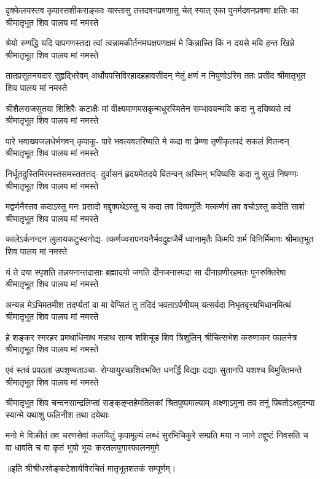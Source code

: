 \fourlineindentedshloka
{दृक्केलयस्तव कृपारसशीकराङ्काः}
{यास्तासु तत्तदवनप्रवणासु चेत् स्यात्}
{एका पुनर्मदवनप्रवणा क्षतिः का}
{श्रीमातृभूत शिव पालय मां नमस्ते} %

\fourlineindentedshloka
{श्रेयो रुणद्धि यदि पापगणस्तदा त्वां}
{त्वन्नामकीर्तनमघक्षपणक्षमं मे}
{किन्नास्ति किं न दयसे मयि हन्त खिन्ने}
{श्रीमातृभूत शिव पालय मां नमस्ते} %

\fourlineindentedshloka
{तातप्रसूतनयदार सुहृद्भिरेवम्}
{अर्थोपपत्तिविरहादहहावसीदन्}
{नेतुं क्षणं न निपुणोऽस्मि ततः प्रसीद}
{श्रीमातृभूत शिव पालय मां नमस्ते} %

\fourlineindentedshloka
{श्रीशैलराजसुतया शिशिरैः कटाक्षैः}
{मां वीक्ष्यमाणमसकृन्मधुरस्मितेन}
{सम्भावयन्मयि कदा नु दयिष्यसे त्वं}
{श्रीमातृभूत शिव पालय मां नमस्ते} %

\fourlineindentedshloka
{पारे भवाख्यजलधेर्भगवन् कृपाकू-}
{पारे भवत्यवतरिष्यति मे कदा वा}
{प्रेम्णा तृणीकृतपदं सकलं वितन्वन्}
{श्रीमातृभूत शिव पालय मां नमस्ते} %

\fourlineindentedshloka
{निर्धूतदुस्तिमिरमस्तसमस्ततत्तद्-}
{दुर्वासनं हृदयमेतदये वितन्वन्}
{अस्मिन् भविष्यसि कदा नु सुखं निषण्णः}
{श्रीमातृभूत शिव पालय मां नमस्ते} %

\fourlineindentedshloka
{मद्वर्णनैस्तव कदाऽस्तु मनः प्रसादो}
{मद्दृक्पथेऽस्तु च कदा तव दिव्यमूर्तिः}
{मत्कर्णगं तव वचोऽस्तु कदेति साशं}
{श्रीमातृभूत शिव पालय मां नमस्ते} %

\fourlineindentedshloka
{कालेऽर्कनन्दन लुलायकटुस्वनोद्य-}
{त्कर्णज्वरापनयनैर्भवदुक्षजैर्मे}
{ध्वानामृतैः किमपि शर्म विनिर्मिमाणः}
{श्रीमातृभूत शिव पालय मां नमस्ते} %

\fourlineindentedshloka
{यं ते दया स्पृशति तन्नयनान्तदासाः}
{ब्रह्मादयो जगति दीनजनास्पदा सा}
{दीनाग्रणीरहमतः पुनरुक्तिरेषा}
{श्रीमातृभूत शिव पालय मां नमस्ते} %

\fourlineindentedshloka
{अन्यन्न मेऽभिमतमीश तदर्प्यतां वा}
{मा वेप्सितं तु तदिदं भवताऽर्पणीयम्}
{यत्सर्वदा निभृतवृत्त्यभिधानमित्थं}
{श्रीमातृभूत शिव पालय मां नमस्ते} %

\fourlineindentedshloka
{हे शङ्कर स्मरहर प्रमथाधिनाथ}
{मन्नाथ साम्ब शशिचूड शिव त्रिशूलिन्}
{श्रीचित्सभेश करुणाकर फालनेत्र}
{श्रीमातृभूत शिव पालय मां नमस्ते} %

\fourlineindentedshloka
{एवं स्तवं प्रपठतां उपश‍ृण्वताञ्चा-}
{रोग्यायुरच्छशिवभक्ति धनर्द्धि विद्याः}
{दद्याः सुतानपि यशश्च विमुक्तिमन्ते}
{श्रीमातृभूत शिव पालय मां नमस्ते} %

\fourlineindentedshloka
{श्रीमातृभूत शिव चन्दनसान्द्रलिप्तां}
{सङ्क्ऌप्तहेमतिलकां श्रितपुष्पमाल्याम्}
{अक्ष्णाऽमुना तव तनुं पिबतोऽक्ष्युदन्या}
{स्यान्मे यथाशु फलिनीश तथा दयेथाः} %

\fourlineindentedshloka
{मनो मे विक्रीतं तव चरणसेवां कलयितुं}
{कृपामूल्यं लब्धं सुरभिचिकुरे सम्प्रति मया}
{न जाने तद्दुष्टं निवसति च वा धावति च वा}
{कृतं भूयो भूयः करतलयुगास्फालनमुमे} %

॥इति श्रीश्रीधरवेङ्कटेशार्यविरचितं मातृभूतशतकं सम्पूर्णम्।